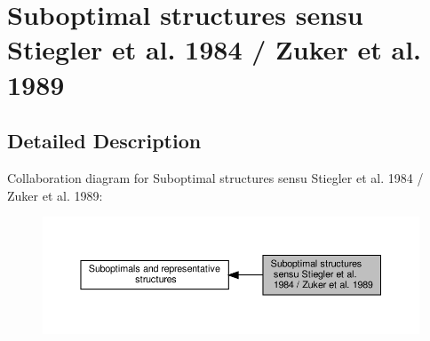\hypertarget{group__subopt__zuker}{}\section{Suboptimal structures sensu Stiegler et al. 1984 / Zuker et al. 1989}
\label{group__subopt__zuker}


\subsection{Detailed Description}
Collaboration diagram for Suboptimal structures sensu Stiegler et al. 1984 / Zuker et al. 1989\+:
\nopagebreak
\begin{figure}[H]
\begin{center}
\leavevmode
\includegraphics[width=350pt]{group__subopt__zuker}
\end{center}
\end{figure}
